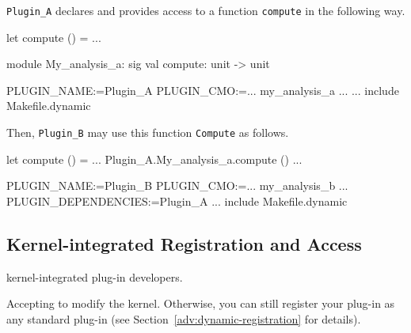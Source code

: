 \begin{example}
\texttt{Plugin\_A} declares and provides access to a function \texttt{compute}
in the following way. 

\begin{ocamlcode}
let compute () = ...
\end{ocamlcode}

\begin{ocamlcode}
module My_analysis_a: sig val compute: unit -> unit
\end{ocamlcode}

\begin{makefilecode}
PLUGIN_NAME:=Plugin_A
PLUGIN_CMO:=... my_analysis_a ...
...
include Makefile.dynamic
\end{makefilecode}

Then, \texttt{Plugin\_B} may use this function \texttt{Compute} as follows.

\begin{ocamlcode}
let compute () = ... Plugin_A.My_analysis_a.compute () ...
\end{ocamlcode}

\begin{makefilecode}
PLUGIN_NAME:=Plugin_B
PLUGIN_CMO:=... my_analysis_b ...
PLUGIN_DEPENDENCIES:=Plugin_A
...
include Makefile.dynamic
\end{makefilecode}
\end{example}

\subsection{Kernel-integrated Registration and Access}
\label{adv:static-registration}

\begin{target}kernel-integrated plug-in developers.\end{target}

\begin{prereq}
  Accepting to modify the \framac kernel. Otherwise, you can still register
  your plug-in as any standard plug-in (see
  Section~\ref{adv:dynamic-registration} for details).
\end{prereq}

